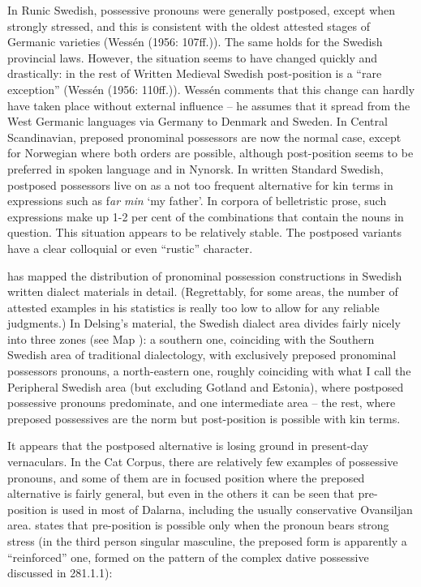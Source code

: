 \begin{styleBodytextC}
In Runic Swedish, possessive pronouns were generally postposed, except when strongly stressed, and this is consistent with the oldest attested stages of Germanic varieties (Wessén (1956: 107ff.)). The same holds for the Swedish provincial laws. However, the situation seems to have changed quickly and drastically: in the rest of Written Medieval Swedish post-position is a “rare exception” (Wessén (1956: 110ff.)). Wessén comments that this change can hardly have taken place without external influence – he assumes that it spread from the West Germanic languages via Germany to Denmark and Sweden. In Central Scandinavian, preposed pronominal possessors are now the normal case, except for Norwegian where both orders are possible, although post-position seems to be preferred in spoken language and in Nynorsk. In written Standard Swedish, postposed possessors live on as a not too frequent alternative for kin terms in expressions such as f\textit{ar min} ‘my father’. In corpora of belletristic prose, such expressions make up 1-2 per cent of the combinations that contain the nouns in question. This situation appears to be relatively stable. The postposed variants have a clear colloquial or even “rustic” character. 

\end{styleBodytextC}

\begin{styleBodytextC}
\citet[32]{Delsing2003a} has mapped the distribution of pronominal possession constructions in Swedish written dialect materials in detail. (Regrettably, for some areas, the number of attested examples in his statistics is really too low to allow for any reliable judgments.) In Delsing’s material, the Swedish dialect area divides fairly nicely into three zones (see Map ): a southern one, coinciding with the Southern Swedish area of traditional dialectology, with exclusively preposed pronominal possessors pronouns, a north-eastern one, roughly coinciding with what I call the Peripheral Swedish area (but excluding Gotland and Estonia), where postposed possessive pronouns predominate, and one intermediate area – the rest, where preposed possessives are the norm but post-position is possible with kin terms.

\end{styleBodytextC}

\begin{styleBodytextC}
It appears that the postposed alternative is losing ground in present-day vernaculars. In the Cat Corpus, there are relatively few examples of possessive pronouns, and some of them are in focused position where the preposed alternative is fairly general, but even in the others it can be seen that pre-position is used in most of Dalarna, including the usually conservative Ovansiljan area. \citet[111]{Levander1909} states that pre-position is possible only when the pronoun bears strong stress (in the third person singular masculine, the preposed form is apparently a “reinforced” one, formed on the pattern of the complex dative possessive discussed in 281.1.1):

\end{styleBodytextC}

